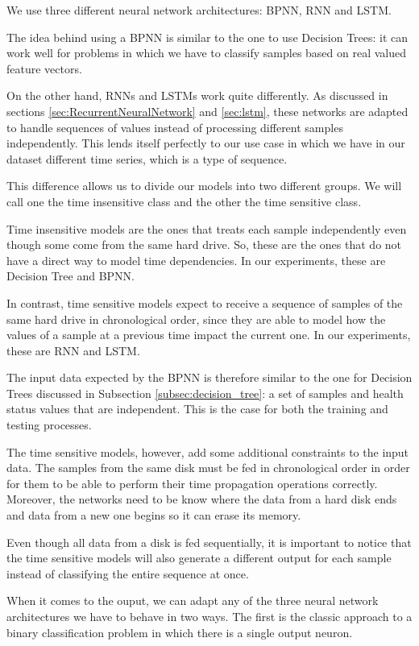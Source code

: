 We use three different neural network architectures: BPNN, RNN and LSTM.

The idea behind using a BPNN is similar to the one to use Decision Trees: it can work well for problems in which we have to classify samples based on real valued feature vectors.

On the other hand, RNNs and LSTMs work quite differently.
As discussed in sections \ref{sec:RecurrentNeuralNetwork} and \ref{sec:lstm}, these networks are adapted to handle sequences of values instead of processing different samples independently.
This lends itself perfectly to our use case in which we have in our dataset different time series, which is a type of sequence. 

This difference allows us to divide our models into two different groups.
We will call one the time insensitive class and the other the time sensitive class. 

Time insensitive models are the ones that treats each sample independently even though some come from the same hard drive.
So, these are the ones that do not have a direct way to model time dependencies.
In our experiments, these are Decision Tree and BPNN.

In contrast, time sensitive models expect to receive a sequence of samples of the same hard drive in chronological order, since they are able to model how the values of a sample at a previous time impact the current one.
In our experiments, these are RNN and LSTM.

The input data expected by the BPNN is therefore similar to the one for Decision Trees discussed in Subsection \ref{subsec:decision_tree}: a set of samples and health status values that are independent.
This is the case for both the training and testing processes.

The time sensitive models, however, add some additional constraints to the input data.
The samples from the same disk must be fed in chronological order in order for them to be able to perform their time propagation operations correctly.
Moreover, the networks need to be know where the data from a hard disk ends and data from a new one begins so it can erase its memory.

Even though all data from a disk is fed sequentially, it is important to notice that the time sensitive models will also generate a different output for each sample instead of classifying the entire sequence at once.

When it comes to the ouput, we can adapt any of the three neural network architectures we have to behave in two ways.
The first is the classic approach to a binary classification problem in which there is a single output neuron.

